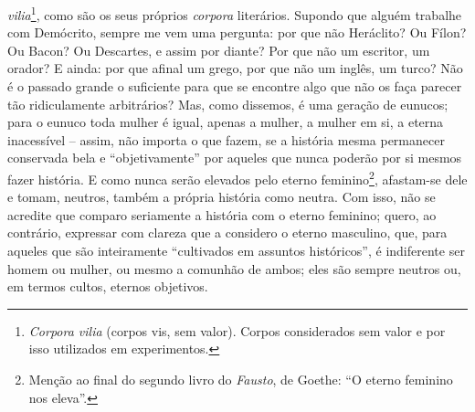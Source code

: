 \emph{vilia}\footnote{\emph{Corpora vilia} (corpos vis, sem valor).
  Corpos considerados sem valor e por isso utilizados em experimentos.},
como são os seus próprios \emph{corpora} literários. Supondo que alguém
trabalhe com Demócrito, sempre me vem uma pergunta: por que não
Heráclito? Ou Fílon? Ou Bacon? Ou Descartes, e assim por diante? Por que
não um escritor, um orador? E ainda: por que afinal um grego, por que
não um inglês, um turco? Não é o passado grande o suficiente para que se
encontre algo que não os faça parecer tão ridiculamente arbitrários?
Mas, como dissemos, é uma geração de eunucos; para o eunuco toda mulher
é igual, apenas a mulher, a mulher em si, a eterna inacessível -- assim,
não importa o que fazem, se a história mesma permanecer conservada bela
e ``objetivamente'' por aqueles que nunca poderão por si mesmos fazer
história. E como nunca serão elevados pelo eterno feminino\footnote{Menção
  ao final do segundo livro do \emph{Fausto}, de Goethe: ``O eterno feminino
  nos eleva''.}, afastam-se dele e tomam, neutros, também a própria
história como neutra. Com isso, não se acredite que comparo seriamente
a história com o eterno feminino; quero, ao contrário, expressar com
clareza que a considero o eterno masculino, que, para aqueles que são
inteiramente ``cultivados em assuntos históricos'', é indiferente ser
homem ou mulher, ou mesmo a comunhão de ambos; eles são sempre neutros
ou, em termos cultos, eternos objetivos.

